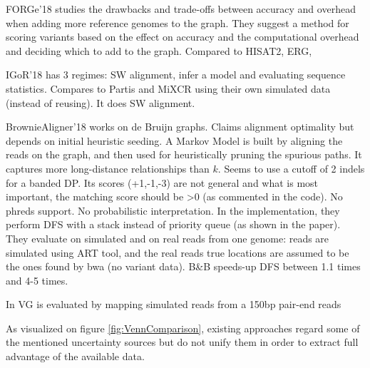 FORGe'18\cite{pritt2018forge} studies the drawbacks and trade-offs between accuracy and overhead when adding more reference genomes to the graph.
They suggest a method for scoring variants based on the effect on accuracy and the computational overhead and deciding which to add to the graph.
Compared to HISAT2, ERG,

IGoR'18\cite{marcou2018high} has 3 regimes: SW alignment, infer a model and evaluating sequence statistics. Compares to Partis and MiXCR using their own simulated data (instead of reusing). It does SW alignment.

BrownieAligner'18\cite{Heydari2018} works on de Bruijn graphs.
Claims alignment optimality but depends on initial heuristic seeding.
A Markov Model is built by aligning the reads on the graph, and then used for heuristically pruning the spurious paths. It captures more long-distance relationships than $k$.
Seems to use a cutoff of 2 indels for a banded DP.
Its scores (+1,-1,-3) are not general and what is most important, the matching score should be >0 (as commented in the code).
No phreds support. No probabilistic interpretation.
In the implementation, they perform DFS with a stack instead of priority queue (as shown in the paper).
They evaluate on simulated and on real reads from one genome: reads are simulated using ART tool\cite{huang2011art}, and the real reads true locations are assumed to be the ones found by bwa (no variant data).
B\&B speeds-up DFS between 1.1 times and 4-5 times.

In\cite{garrison2018variation} VG is evaluated by mapping simulated reads from a 150bp pair-end reads

As visualized on figure \ref{fig:VennComparison}, existing approaches regard some of the mentioned uncertainty sources but do not unify them in order to extract full advantage of the available data.
